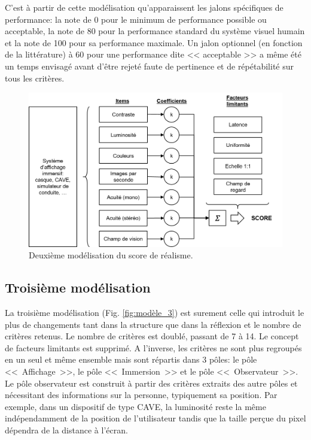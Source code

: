 	\par C'est à partir de cette modélisation qu'apparaissent les jalons spécifiques de performance: la note de 0 pour le minimum de performance possible ou acceptable, la note de 80 pour la performance standard du système visuel humain et la note de 100 pour sa performance maximale. Un jalon optionnel (en fonction de la littérature) à 60 pour une performance dite << acceptable >> a même été un temps envisagé avant d'être rejeté faute de pertinence et de répétabilité sur tous les critères.
	
	\begin{figure}
		\centering
		\includegraphics[scale=.8]{Figures/Modele2_2}
		\caption{Deuxième modélisation du score de réalisme.}
		\label{fig:modèle_2}
	\end{figure}
	
	\subsection{Troisième modélisation}
	\par La troisième modélisation (Fig. \ref{fig:modèle_3}) est surement celle qui introduit le plus de changements tant dans la structure que dans la réflexion et le nombre de critères retenus. Le nombre de critères est doublé, passant de 7 à 14. Le concept de facteurs limitants est supprimé. A l'inverse, les critères ne sont plus regroupés en un seul et même ensemble mais sont répartis dans 3 pôles: le pôle <<~Affichage~>>, le pôle <<~Immersion~>> et le pôle <<~Observateur~>>. Le pôle observateur est construit à partir des critères extraits des autre pôles et nécessitant des informations sur la personne, typiquement sa position. Par exemple, dans un dispositif de type CAVE, la luminosité reste la même indépendamment de la position de l'utilisateur tandis que la taille perçue du pixel dépendra de la distance à l'écran. 
	
